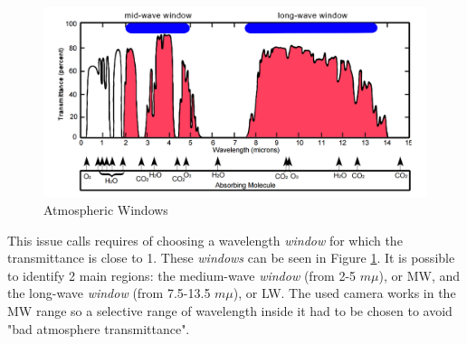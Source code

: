 \begin{figure}[h]
\includegraphics[width=1\linewidth]{Figures/2.Chapter/atmospheric_window.png}
\caption{Atmospheric Windows}
\label{fig:atm}
\end{figure}

\par This issue calls requires of choosing a wavelength \textit{window} for which the transmittance is close to 1. These \textit{windows} can be seen in Figure \ref{fig:atm}. It is possible to identify 2 main regions: the medium-wave \textit{window} (from 2-5 $m \mu$), or MW, and the long-wave \textit{window} (from 7.5-13.5 $m \mu$), or LW. The used camera works in the MW range so a selective range of wavelength inside it had to be chosen to avoid "bad atmosphere transmittance".\\

